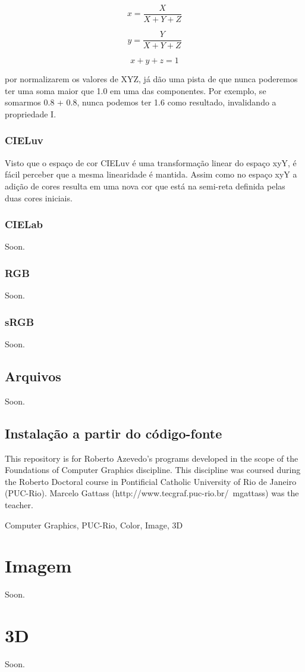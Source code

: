 \documentclass[a4paper,10pt]{report}
\begin{document}
\begin{equation}
x=\frac{X}{X+Y+Z}
\end{equation}

\begin{equation}
y=\frac{Y}{X+Y+Z}
\end{equation}

\begin{equation}
x+y+z=1
\end{equation}

por normalizarem os valores de XYZ, já dão uma pista de que nunca poderemos ter
uma soma maior que 1.0 em uma das componentes. Por exemplo, se somarmos 0.8 +
0.8, nunca podemos ter 1.6 como resultado, invalidando a propriedade I.

\subsection{CIELuv}
Visto que o espaço de cor CIELuv é uma transformação linear do espaço xyY, é
fácil perceber que a mesma linearidade é mantida. Assim como no espaço xyY a
adição de cores resulta em uma nova cor que está na semi-reta definida pelas
duas cores iniciais.

\subsection{CIELab}
Soon.

\subsection{RGB}
Soon.

\subsection{sRGB}
Soon.

\section{Arquivos}
Soon.

\section{Instalação a partir do código-fonte}
This repository is for Roberto Azevedo's programs developed in the scope of the
Foundations of Computer Graphics discipline. This discipline was coursed during
the Roberto Doctoral course in Pontificial Catholic University of Rio de Janeiro
(PUC-Rio). Marcelo Gattass (http://www.tecgraf.puc-rio.br/~mgattass) was the
teacher.

Computer Graphics, PUC-Rio, Color, Image, 3D

\chapter{Imagem}
Soon.

\chapter{3D}
Soon.
\end{document}
